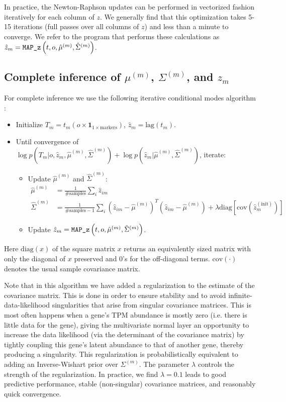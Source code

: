 \documentclass[10pt]{article}
\begin{document}
In practice, the Newton-Raphson updates can be performed in vectorized fashion iteratively for each column of $z$. We generally find that this optimization takes 5-15 iterations (full passes over all columns of $z$) and less than a minute to converge.  We refer to the program that performs these calculations as $\hat{z}_m = \verb|MAP_z| \left(t, o, \hat{\mu}^{(m)}, \hat{\Sigma}^{(m)} \right)$.


\subsection{Complete inference of $\mu^{(m)}$, $\Sigma^{(m)}$, and $z_m$}

For complete inference we use the following iterative conditional modes algorithm \cite{Besag1986}:
\begin{itemize}
\item Initialize $T_m = t_m(o \times \textbf{1}_{1 \times \textrm{markers}} )$, $\hat{z}_m = \textrm{lag}(t_m)$.
\item Until convergence of $\log p(T_m | o, \hat{z}_m, \hat{\mu}^{(m)}, \hat{\Sigma}^{(m)}) + \log p(\hat{z}_m| \hat{\mu}^{(m)}, \hat{\Sigma}^{(m)})$, iterate:
\begin{itemize}
\item Update $\hat{\mu}^{(m)}$ and $\hat{\Sigma}^{(m)}$:
\begin{align*}
\hat{\mu}^{(m)} & = \frac{1}{\#\textrm{samples}} \sum_i \hat{z}_{im} \\
\hat{\Sigma}^{(m)} & = \frac{1}{\#\textrm{samples} - 1} \sum_i (\hat{z}_{im} - \hat{\mu}^{(m)})^T(\hat{z}_{im} - \hat{\mu}^{(m)}) + \lambda\textrm{diag}\left[\textrm{cov}\left(\hat{z}_m^{(\textrm{init})} \right) \right]
\end{align*}
\item Update  $\hat{z}_m = \verb|MAP_z| \left(t, o, \hat{\mu}^{(m)}, \hat{\Sigma}^{(m)} \right)$.
\end{itemize}
\end{itemize}
Here $\textrm{diag}(x)$ of the square matrix $x$ returns an equivalently sized matrix with only the diagonal of $x$ preserved and 0's for the off-diagonal terms. $\textrm{cov}(\cdot)$ denotes the usual sample covariance matrix.

Note that in this algorithm we have added a regularization to the estimate of the covariance matrix. This is done in order to ensure stability and to avoid infinite-data-likelihood singularities that arise from singular covariance matrices. This is most often happens when a gene's TPM abundance is mostly zero (i.e. there is little data for the gene), giving the multivariate normal layer an opportunity to increase the data likelihood (via the determinant of the covariance matrix) by tightly coupling this gene's latent abundance to that of another gene, thereby producing a singularity. This regularization is probabilistically equivalent to adding an Inverse-Wishart prior over $\Sigma^{(m)}$. The parameter $\lambda$ controls the strength of the regularization. In practice, we find $\lambda = 0.1$ leads to good predictive performance, stable (non-singular) covariance matrices, and reasonably quick convergence.
\end{document}
